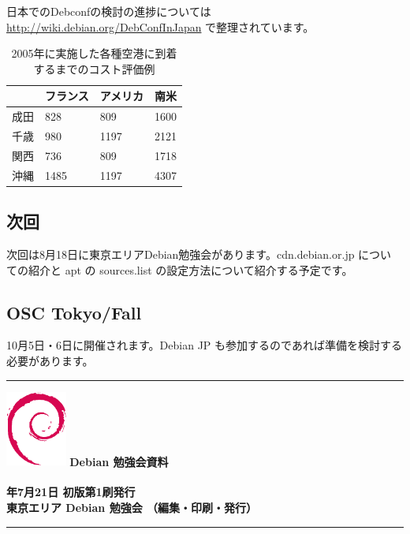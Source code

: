 \documentclass[mingoth,a4paper]{jsarticle}
\newcommand{\debmtgyear}{2007}
\newcommand{\debmtgdate}{21}
\newcommand{\debmtgmonth}{7}
\begin{document}
日本でのDebconfの検討の進捗については
\url{http://wiki.debian.org/DebConfInJapan}
で整理されています。

\begin{table}[H]
\caption{2005年に実施した各種空港に到着するまでのコスト評価例}
\label{tab:framework}
\begin{center}
{\LARGE
  \begin{tabularx}{\hsize}{|c|X|X|X|}
 \hline
 & フランス & アメリカ & 南米 \\
 \hline
成田 & 828 & 809 & 1600 \\
千歳 &980 & 1197 &2121 \\
関西 &736 & 809 &1718 \\
沖縄 &1485 & 1197 &4307 \\
 \hline
 \end{tabularx}
}
\end{center} 
\end{table}


\subsection{次回}
次回は8月18日に東京エリアDebian勉強会があります。cdn.debian.or.jp につい
ての紹介と apt の sources.list の設定方法について紹介する予定です。

\subsection{OSC Tokyo/Fall}

10月5日・6日に開催されます。Debian JP も参加するのであれば準備を検討する
必要があります。

\cleartooddpage

\begin{minipage}[b]{0.2\hsize}
 \colorbox{dancerlightblue}{}
\end{minipage}
\begin{minipage}[b]{0.8\hsize}

\vspace*{15cm}
{\color{dancerlightblue}\rule{\hsize}{1mm}}
\vspace{2mm}
\includegraphics[width=2cm]{image200502/openlogo-nd.eps}
\noindent \Large \bf Debian 勉強会資料\\ \\
\noindent \normalfont \debmtgyear{}年\debmtgmonth{}月\debmtgdate{}日 \hspace{5mm}  初版第1刷発行\\
\noindent \normalfont 東京エリア Debian 勉強会 （編集・印刷・発行）\\
{\color{dancerdarkblue}\rule{\hsize}{1mm}}
\end{minipage}
\end{document}
